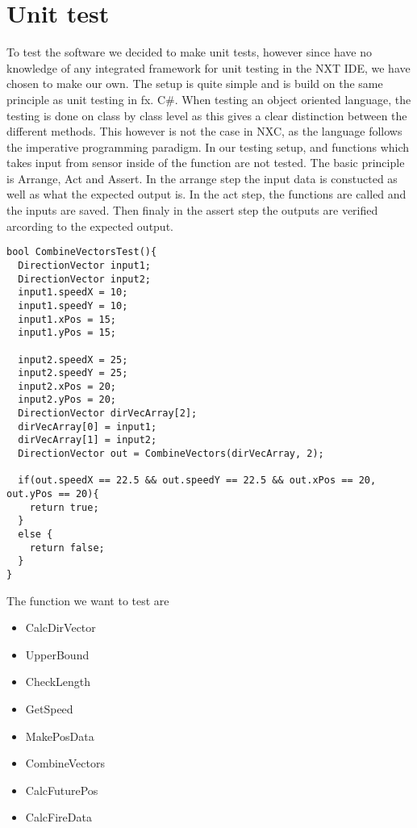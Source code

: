 \chapter{Unit test}

To test the \name software we decided to make unit tests, however since have no
knowledge of any integrated framework for unit testing in the NXT IDE, we
have chosen to make our own. The setup is quite simple and is build on the same
principle as unit testing in fx. C\#. When testing an object oriented
language, the testing is done on class by class level as this gives a clear
distinction between the different methods. This however is not the case in NXC,
as the language follows the imperative programming paradigm. In our testing
setup,  and functions which takes input from
sensor inside of the function are not tested.
The basic principle is Arrange, Act and Assert. In the arrange step the input
data is constucted as well as what the expected output is. In the act step, the
functions are called and the inputs are saved. Then finaly in the assert step
the outputs are verified arcording to the expected output. \nl

\begin{minipage}[H]{\linewidth}
\begin{lstlisting}[caption =Unit Test for Combine Vectors,label=combineVectorsTest] 
bool CombineVectorsTest(){
  DirectionVector input1;
  DirectionVector input2;
  input1.speedX = 10;
  input1.speedY = 10;
  input1.xPos = 15;
  input1.yPos = 15;
  
  input2.speedX = 25;
  input2.speedY = 25;
  input2.xPos = 20;
  input2.yPos = 20;
  DirectionVector dirVecArray[2];
  dirVecArray[0] = input1;
  dirVecArray[1] = input2;
  DirectionVector out = CombineVectors(dirVecArray, 2);
  
  if(out.speedX == 22.5 && out.speedY == 22.5 && out.xPos == 20, out.yPos == 20){
    return true;
  }
  else {
    return false;
  }
}
\end{lstlisting}
\end{minipage}

The function we want to test are

\begin{itemize}
  \item CalcDirVector
  \item UpperBound
  \item CheckLength
  \item GetSpeed
  \item MakePosData
  \item CombineVectors
  \item CalcFuturePos
  \item CalcFireData
\end{itemize} 

